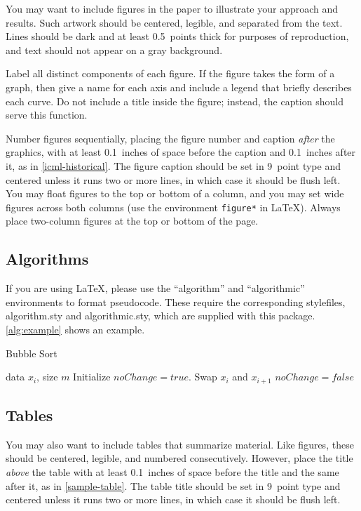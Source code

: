 \documentclass{article}
\theoremstyle{plain}
\theoremstyle{definition}
\theoremstyle{remark}
\begin{document}
You may want to include figures in the paper to illustrate
your approach and results. Such artwork should be centered,
legible, and separated from the text. Lines should be dark and at
least 0.5~points thick for purposes of reproduction, and text should
not appear on a gray background.

Label all distinct components of each figure. If the figure takes the
form of a graph, then give a name for each axis and include a legend
that briefly describes each curve. Do not include a title inside the
figure; instead, the caption should serve this function.

Number figures sequentially, placing the figure number and caption
\emph{after} the graphics, with at least 0.1~inches of space before
the caption and 0.1~inches after it, as in
\cref{icml-historical}. The figure caption should be set in
9~point type and centered unless it runs two or more lines, in which
case it should be flush left. You may float figures to the top or
bottom of a column, and you may set wide figures across both columns
(use the environment \texttt{figure*} in \LaTeX). Always place
two-column figures at the top or bottom of the page.

\subsection{Algorithms}

If you are using \LaTeX, please use the ``algorithm'' and ``algorithmic''
environments to format pseudocode. These require
the corresponding stylefiles, algorithm.sty and
algorithmic.sty, which are supplied with this package.
\cref{alg:example} shows an example.

\begin{algorithm}[tb]
   \caption{Bubble Sort}
   \label{alg:example}
\begin{algorithmic}
    data $x_i$, size $m$
   \REPEAT
   \STATE Initialize $noChange = true$.
   \STATE Swap $x_i$ and $x_{i+1}$
   \STATE $noChange = false$
   \ENDIF
   \ENDFOR
\end{algorithmic}
\end{algorithm}

\subsection{Tables}

You may also want to include tables that summarize material. Like
figures, these should be centered, legible, and numbered consecutively.
However, place the title \emph{above} the table with at least
0.1~inches of space before the title and the same after it, as in
\cref{sample-table}. The table title should be set in 9~point
type and centered unless it runs two or more lines, in which case it
should be flush left.
\end{document}
